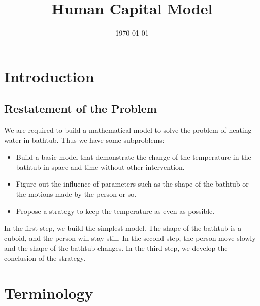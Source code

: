 \documentclass[12pt,a4paper,titlepage]{article}
\begin{document}
\title{Human Capital Model} \date{\today{}}
\maketitle

\tableofcontents

\newpage

\section{Introduction}
\label{sec:introduction}

\subsection{Restatement of the Problem}
\label{sec:restatement-of-the-problem}
We are required to build a mathematical model to solve the problem of heating water in bathtub. Thus we have some subproblems:
\begin{itemize}
\item Build a basic model that demonstrate the change of the temperature in the bathtub in space and time without other intervention.
\item Figure out the influence of parameters such as the shape of the bathtub or the motions made by the person or so.
\item Propose a strategy to keep the temperature as even as possible.
\end{itemize}
In the first step, we build the simplest model. The shape of the bathtub is a cuboid, and the person will stay still. In the second step, the person move slowly and the shape of the bathtub changes. In the third step, we develop the conclusion of the strategy.

\section{Terminology}
\label{sec:terminology}
\end{document}
